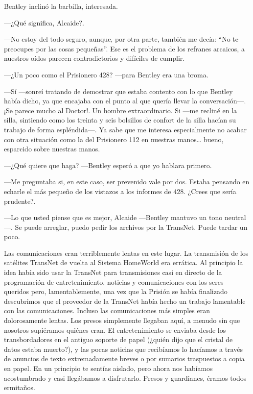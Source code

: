 Bentley inclinó la barbilla, interesada.

---¿Qué significa, Alcaide?.

---No estoy del todo seguro, aunque, por otra parte, también me decía:
``No te preocupes por las cosas pequeñas''. Ese es el problema de los
refranes arcaicos, a nuestros oídos parecen contradictorios y difíciles
de cumplir.

---¿Un poco como el Prisionero 428? ---para Bentley era una broma.

---Sí ---sonreí tratando de demostrar que estaba contento con lo que
Bentley había dicho, ya que encajaba con el punto al que quería llevar
la conversación---. ¡Se parece mucho al Doctor!. Un hombre
extraordinario. Si ---me recliné en la silla, sintiendo como los treinta
y seis bolsillos de confort de la silla hacían su trabajo de forma
espléndida---. Ya sabe que me interesa especialmente no acabar con otra
situación como la del Prisionero 112 en nuestras manos\ldots{} bueno,
esparcido sobre nuestras manos.

---¿Qué quiere que haga? ---Bentley esperó a que yo hablara primero.

---Me preguntaba si, en este caso, ser prevenido vale por dos. Estaba
pensando en echarle el más pequeño de los vistazos a los informes de
428. ¿Crees que sería prudente?.

---Lo que usted piense que es mejor, Alcaide ---Bentley mantuvo un tono
neutral---. Se puede arreglar, puedo pedir los archivos por la TransNet.
Puede tardar un poco.

Las comunicaciones eran terriblemente lentas en este lugar. La
transmisión de los satélites TransNet de vuelta al Sistema HomeWorld era
errática. Al principio la idea había sido usar la TransNet para
transmisiones casi en directo de la programación de entretenimiento,
noticias y comunicaciones con los seres queridos pero, lamentablemente,
una vez que la Prisión se había finalizado descubrimos que el proveedor
de la TransNet había hecho un trabajo lamentable con las comunicaciones.
Incluso las comunicaciones más simples eran dolorosamente lentas. Los
presos simplemente llegaban aquí, a menudo sin que nosotros supiéramos
quiénes eran. El entretenimiento se enviaba desde los transbordadores en
el antiguo soporte de papel (¿quién dijo que el cristal de datos estaba
muerto?), y las pocas noticias que recibíamos lo hacíamos a través de
anuncios de texto extremadamente breves o por sumarios traspuestos a
copia en papel. En un principio te sentías aislado, pero ahora nos
habíamos acostumbrado y casi llegábamos a disfrutarlo. Presos y
guardianes, éramos todos ermitaños.

